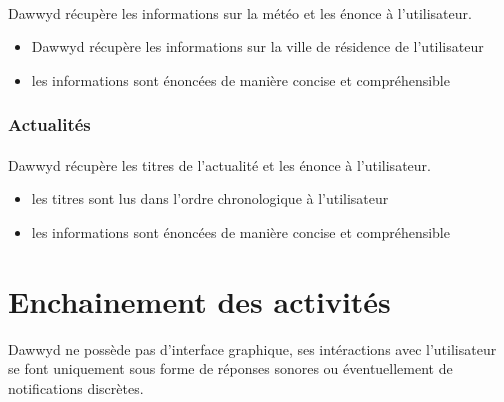 \documentclass[12pt]{article}
\begin{document}
    \paragraph{}
    Dawwyd récupère les informations sur la météo et les énonce à
    l'utilisateur.

    \begin{itemize}
        \item Dawwyd récupère les informations sur la ville de résidence de
            l'utilisateur
        \item les informations sont énoncées de manière concise et
            compréhensible
    \end{itemize}

    \subsubsection{Actualités}
    \paragraph{}
    Dawwyd récupère les titres de l'actualité et les énonce à l'utilisateur.

    \begin{itemize}
        \item les titres sont lus dans l'ordre chronologique à l'utilisateur
        \item les informations sont énoncées de manière concise et
            compréhensible
    \end{itemize}


    \section{Enchainement des activités}

    Dawwyd ne possède pas d'interface graphique, ses intéractions avec
    l'utilisateur se font uniquement sous forme de réponses sonores
    ou éventuellement de notifications discrètes.
\end{document}

